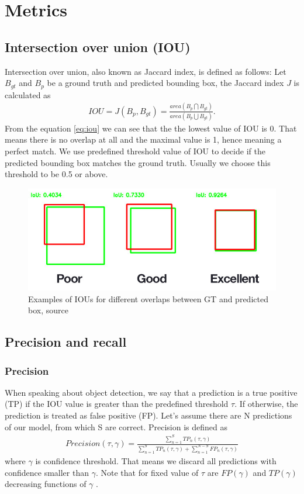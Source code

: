 \section{Metrics}
\subsection{Intersection over union (IOU) }
Intersection over union, also known as Jaccard index, is defined as follows: Let $B_{gt}$ and $B_p$ be a ground truth and predicted bounding box, the Jaccard index $J$ is calculated as
\begin{align}
    IOU = J(B_p, B_{gt}) = \frac{area(B_p \bigcap B_{gt})}{area(B_p \bigcup B_{gt})}.
    \label{eq:iou}
\end{align}
From the equation \ref{eq:iou} we can see that the the lowest value of IOU is 0. That means there is no overlap at all and the maximal value is 1, hence meaning a perfect match.
We use predefined threshold value of IOU to decide if the predicted bounding box matches the ground truth. Usually we choose this threshold to be 0.5 or above.

\begin{figure}
    \includegraphics[width = \linewidth]{images/IOU.jpg}
    \caption{Examples of IOUs for different overlaps between GT and predicted box, source \cite{Cowton2019}}
    \label{fig:iou}
\end{figure}

\subsection{Precision and recall}
\subsubsection{Precision}
\label{subsec:precision}
When speaking about object detection, we say that a prediction is a true positive (TP) if the IOU value is greater than the predefined threshold $\tau$. If otherwise, the prediction is treated as false positive (FP). Let's assume there are N predictions of our model, from which S are correct. Precision is defined as
\begin{align}
    Precision(\tau, \gamma) = \frac{\sum_{n=1}^S TP_n(\tau, \gamma)}{\sum_{n=1}^S TP_n(\tau, \gamma) + \sum_{n=1}^{N-S} FP_n(\tau, \gamma)}
\end{align}
where $\gamma$ is confidence threshold. That means we discard all predictions with confidence smaller than $\gamma$. Note that for fixed value of $\tau$ are $FP(\gamma)$ and $TP(\gamma)$ decreasing functions of $\gamma$ \cite{Padilla2021}.


